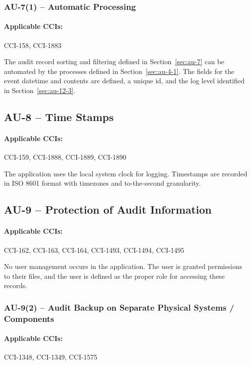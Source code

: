 \documentclass[letterpaper, 10pt, twoside]{article}
\begin{document}
\subsubsection{AU-7(1) -- Automatic Processing}

\paragraph{Applicable CCIs:} CCI-158, CCI-1883

The audit record sorting and filtering defined in Section~\ref{sec:au-7} can be automated by the processes defined in Section~\ref{sec:au-4-1}. The fields for the event datetime and contents are defined, a unique id, and the log level identified in Section~\ref{sec:au-12-3}.

\subsection{AU-8 -- Time Stamps}

\paragraph{Applicable CCIs:} CCI-159, CCI-1888, CCI-1889, CCI-1890

The application uses the local system clock for logging. Timestamps are recorded in ISO 8601 format with timezones and to-the-second granularity.

\subsection{AU-9 -- Protection of Audit Information}

\paragraph{Applicable CCIs:} CCI-162, CCI-163, CCI-164, CCI-1493, CCI-1494, CCI-1495

No user management occurs in the application. The user is granted permissions to their files, and the user is defined as the proper role for accessing these records.

\subsubsection{AU-9(2) -- Audit Backup on Separate Physical Systems / Components}

\paragraph{Applicable CCIs:} CCI-1348, CCI-1349, CCI-1575
\end{document}
